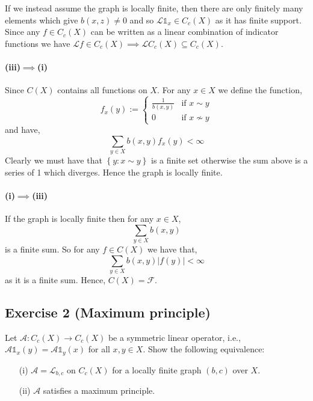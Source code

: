If we instead assume the graph is locally finite, then there are only finitely many elements which give $b(x,z)\neq 0$ and so $\mathcal{L}\mathds{1}_{x}\in C_{c}(X)$ as it has finite support. Since any $f\in C_{c}(X)$ can be written as a linear combination of indicator functions we have $\mathcal{L}f\in C_{c}(X)\implies\mathcal{L}C_{c}(X)\subseteq C_{c}(X)$.

\paragraph{(iii)$\implies$(i)}
Since $C(X)$ contains all functions on $X$. For any $x\in X$ we define the function,
\begin{equation*}
	f_{x}(y) :=
	\begin{cases}
		\frac{1}{b(x,y)}& \text{if }x\sim y\\
		0& \text{if }x\not\sim y
	\end{cases}
\end{equation*}
and have,
\begin{equation*}
	\sum_{y\in X}b(x,y)f_{x}(y)<\infty
\end{equation*}
Clearly we must have that $\left\{y\colon x\sim y\right\}$ is a finite set otherwise the sum above is a series of 1 which diverges. Hence the graph is locally finite.

\paragraph{(i)$\implies$(iii)}
If the graph is locally finite then for any $x\in X$,
\begin{equation*}
	\sum_{y\in X}b(x,y)
\end{equation*}
is a finite sum. So for any $f\in C(X)$ we have that,
\begin{equation*}
	\sum_{y\in X}b(x,y)|f(y)|<\infty
\end{equation*}
as it is a finite sum. Hence, $C(X)=\mathcal{F}$.

\subsection{Exercise 2 (Maximum principle)}

Let $\mathcal{A}:C_{c}(X)\to C_{c}(X)$ be a symmetric linear operator, i.e., $\mathcal{A}\mathds{1}_{x}(y) = \mathcal{A}\mathds{1}_{y}(x)$ for all $x,y\in X$. Show the following equivalence:
\begin{itemize}
	\item [(i)]
		$\mathcal{A}=\mathcal{L}_{b,c}$ on $C_{c}(X)$ for a locally finite graph $(b,c)$ over $X$.
	\item [(ii)]
		$\mathcal{A}$ satisfies a maximum principle.
\end{itemize}

